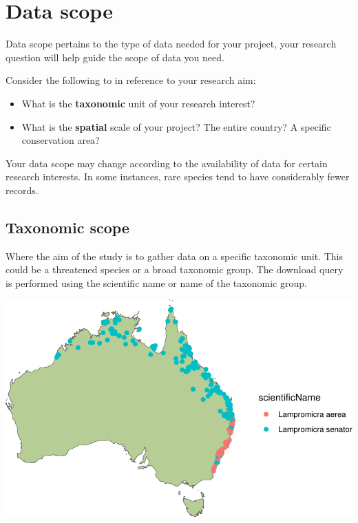 \documentclass[
  letterpaper,
  DIV=11,
  numbers=noendperiod,
  oneside]{scrreprt}
\providecommand{\tightlist}{%
  \setlength{\itemsep}{0pt}\setlength{\parskip}{0pt}}\usepackage{longtable,booktabs,array}
\begin{document}

\hypertarget{data-scope}{%
\chapter{Data scope}\label{data-scope}}

Data scope pertains to the type of data needed for your project, your
research question will help guide the scope of data you need.

Consider the following to in reference to your research aim:

\begin{itemize}
\tightlist
\item
  What is the \textbf{taxonomic} unit of your research interest?
\item
  What is the \textbf{spatial} scale of your project? The entire
  country? A specific conservation area?
\end{itemize}

Your data scope may change according to the availability of data for
certain research interests. In some instances, rare species tend to have
considerably fewer records.

\hypertarget{taxonomic-scope}{%
\section{Taxonomic scope}\label{taxonomic-scope}}

Where the aim of the study is to gather data on a specific taxonomic
unit. This could be a threatened species or a broad taxonomic group. The
download query is performed using the scientific name or name of the
taxonomic group.

\includegraphics{./scope_files/figure-pdf/unnamed-chunk-1-1.pdf}
\end{document}
